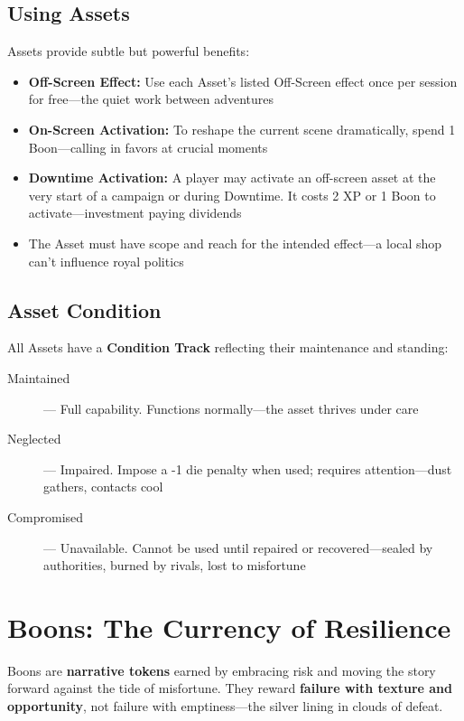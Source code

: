 \subsection*{Using Assets}

Assets provide subtle but powerful benefits:

\begin{itemize}
    \item \textbf{Off-Screen Effect:} Use each Asset's listed Off-Screen effect once per session for free—the quiet work between adventures
    \item \textbf{On-Screen Activation:} To reshape the current scene dramatically, spend 1 Boon—calling in favors at crucial moments
    \item \textbf{Downtime Activation:} A player may activate an off-screen asset at the very start of a campaign or during Downtime. It costs 2 XP or 1 Boon to activate—investment paying dividends
    \item The Asset must have scope and reach for the intended effect—a local shop can't influence royal politics
\end{itemize}

\subsection*{Asset Condition}

All Assets have a \textbf{Condition Track} reflecting their maintenance and standing:

\begin{description}
    \item[Maintained] --- Full capability. Functions normally—the asset thrives under care
    \item[Neglected] --- Impaired. Impose a -1 die penalty when used; requires attention—dust gathers, contacts cool
    \item[Compromised] --- Unavailable. Cannot be used until repaired or recovered—sealed by authorities, burned by rivals, lost to misfortune
\end{description}

\section*{Boons: The Currency of Resilience}

Boons are \textbf{narrative tokens} earned by embracing risk and moving the story forward against the tide of misfortune. They reward \textbf{failure with texture and opportunity}, not failure with emptiness—the silver lining in clouds of defeat.

